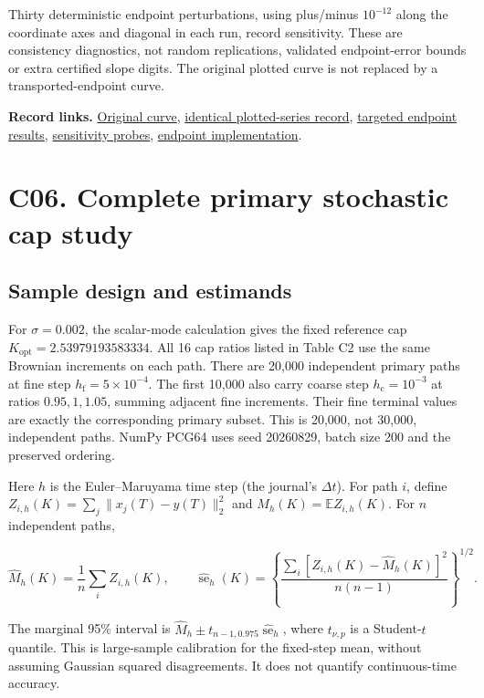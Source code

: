 \documentclass[11pt,a4paper]{article}
\begin{document}
Thirty deterministic endpoint perturbations, using plus/minus
\(10^{-12}\) along the coordinate axes and diagonal in each run, record
sensitivity. These are consistency diagnostics, not random replications,
validated endpoint-error bounds or extra certified slope digits. The
original plotted curve is not replaced by a transported-endpoint curve.

\textbf{Record links.}
\href{../data/records/phase_map_validation.csv}{Original curve},
\href{../data/figure_series/phase_map_validation.csv}{identical
plotted-series record},
\href{../data/targeted_reference/phase/phase_reference.json}{targeted
endpoint results},
\href{../data/targeted_reference/phase/phase_endpoint_sensitivity.csv}{sensitivity
probes}, \href{../targeted/phase_reference.py}{endpoint implementation}.

\section{C06. Complete primary stochastic cap study}\label{c06}

\subsection{Sample design and estimands}\label{c06-estimands}

For \(\sigma=0.002\), the scalar-mode calculation gives the fixed
reference cap \(K_{\mathrm{opt}}=2.53979193583334\). All 16 cap ratios
listed in Table C2 use the same Brownian increments on each path. There
are 20,000 independent primary paths at fine step
\(h_{\mathrm{f}}=5\times10^{-4}\). The first 10,000 also carry coarse
step \(h_{\mathrm{c}}=10^{-3}\) at ratios \(0.95,1,1.05\), summing
adjacent fine increments. Their fine terminal values are exactly the
corresponding primary subset. This is 20,000, not 30,000, independent
paths. NumPy PCG64 uses seed 20260829, batch size 200 and the preserved
ordering.

Here \(h\) is the Euler--Maruyama time step (the journal's
\(\Delta t\)). For path \(i\), define
\(Z_{i,h}(K)=\sum_j\|x_j(T)-y(T)\|_2^2\) and
\(M_h(K)=\mathbb E Z_{i,h}(K)\). For \(n\) independent paths,

\[
\widehat M_h(K)=\frac1n\sum_i Z_{i,h}(K),\qquad
\widehat{\operatorname{se}}_h(K)=\left\{\frac{\sum_i[Z_{i,h}(K)-\widehat M_h(K)]^2}{n(n-1)}\right\}^{1/2}. \tag{E07}
\]

The marginal 95\% interval is
\(\widehat M_h\pm t_{n-1,0.975}\widehat{\operatorname{se}}_h\), where
\(t_{\nu,p}\) is a Student-\(t\) quantile. This is large-sample
calibration for the fixed-step mean, without assuming Gaussian squared
disagreements. It does not quantify continuous-time accuracy.
\end{document}

